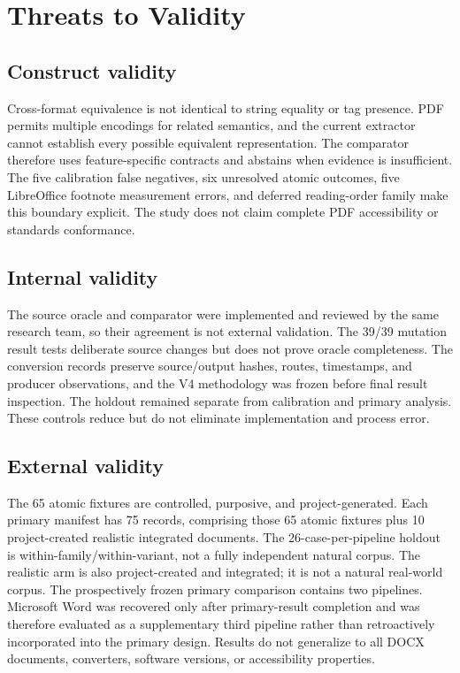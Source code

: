 \section{Threats to Validity}
\label{sec:threats}

\subsection{Construct validity}
Cross-format equivalence is not identical to string equality or tag presence. PDF permits multiple encodings for related semantics, and the current extractor cannot establish every possible equivalent representation. The comparator therefore uses feature-specific contracts and abstains when evidence is insufficient. The five calibration false negatives, six unresolved atomic outcomes, five LibreOffice footnote measurement errors, and deferred reading-order family make this boundary explicit. The study does not claim complete PDF accessibility or standards conformance.

\subsection{Internal validity}
The source oracle and comparator were implemented and reviewed by the same research team, so their agreement is not external validation. The 39/39 mutation result tests deliberate source changes but does not prove oracle completeness. The conversion records preserve source/output hashes, routes, timestamps, and producer observations, and the V4 methodology was frozen before final result inspection. The holdout remained separate from calibration and primary analysis. These controls reduce but do not eliminate implementation and process error.

\subsection{External validity}
The 65 atomic fixtures are controlled, purposive, and project-generated. Each primary manifest has 75 records, comprising those 65 atomic fixtures plus 10 project-created realistic integrated documents. The 26-case-per-pipeline holdout is within-family/within-variant, not a fully independent natural corpus. The realistic arm is also project-created and integrated; it is not a natural real-world corpus. The prospectively frozen primary comparison contains two pipelines. Microsoft Word was recovered only after primary-result completion and was therefore evaluated as a supplementary third pipeline rather than retroactively incorporated into the primary design. Results do not generalize to all DOCX documents, converters, software versions, or accessibility properties.

